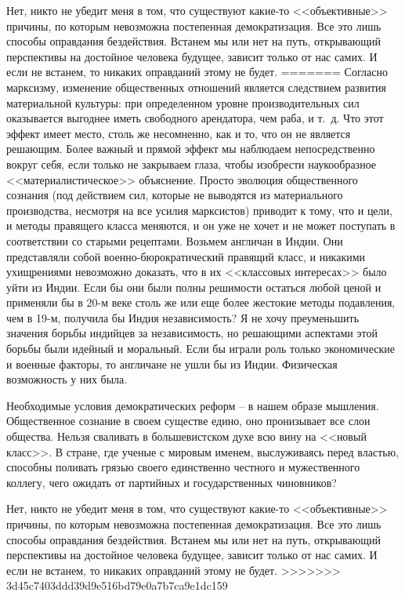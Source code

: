 \documentclass{book}
\begin{document}
Нет, никто не убедит меня в том, что существуют какие‑то <<объективные>> причины, по которым невозможна постепенная демократизация. Все это лишь способы оправдания бездействия. Встанем мы или нет на путь, открывающий перспективы на достойное человека будущее, зависит только от нас самих. И если не встанем, то никаких оправданий этому не будет.
=======
Согласно марксизму, изменение общественных отношений является следствием развития материальной культуры: при определенном уровне производительных сил оказывается выгоднее иметь свободного арендатора, чем раба, и т.~д. Что этот эффект имеет место, столь же несомненно, как и то, что он не является решающим. Более важный и прямой эффект мы наблюдаем непосредственно вокруг себя, если только не закрываем глаза, чтобы изобрести наукообразное <<материалистическое>> объяснение. Просто эволюция общественного сознания (под действием сил, которые не выводятся из материального производства, несмотря на все усилия марксистов) приводит к тому, что и цели, и методы правящего класса меняются, и он уже не хочет и не может поступать в соответствии со ста­рыми рецептами. Возьмем англичан в Индии. Они представля­ли собой военно-бюрократический правящий класс, и никаки­ми ухищрениями невозможно доказать, что в их <<классовых интересах>> было уйти из Индии. Если бы они были полны реши­мости остаться любой ценой и применяли бы в 20-м 
веке столь же или еще более жестокие методы подавления, чем в 19-м, получила бы Индия независимость? Я не хочу преуменьшить значения борьбы индийцев за независимость, но решающими ас­пектами этой борьбы были идейный и моральный. Если бы играли роль только экономические и военные факторы, то англичане не ушли бы из Индии. Физическая возможность у них была.

Необходимые условия демократических реформ -- в нашем образе мышления. Общественное сознание в своем существе едино, оно пронизывает все слои общества. Нельзя сваливать в большевистском духе всю вину на <<новый класс>>. В стране, где ученые с мировым именем, выслуживаясь перед властью, способны поливать грязью своего единственно честного и мужественного коллегу, чего ожидать от партийных и государственных чиновников?

Нет, никто не убедит меня в том, что существуют какие-то <<объективные>> причины, по которым невозможна постепенная демократизация. Все это лишь способы оправдания бездействия. Встанем мы или нет на путь, открывающий перспективы на достойное человека будущее, зависит только от нас самих. И если не встанем, то никаких оправданий этому не будет.
>>>>>>> 3d45c7403ddd39d9e516bd79e0a7b7ca9e1dc159
\end{document}
